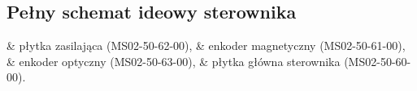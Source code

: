 \begin{appendices}

\section{Pełny schemat ideowy sterownika}
\label{s:attachmenta}

\begin{easylist}
	& płytka zasilająca (MS02-50-62-00),
	& enkoder magnetyczny (MS02-50-61-00),
	& enkoder optyczny (MS02-50-63-00),
	& płytka główna sterownika (MS02-50-60-00).
\end{easylist}	






\clearpage
\end{appendices}





